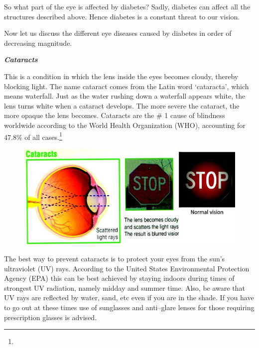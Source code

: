 So what part of the eye is affected by diabetes? Sadly, diabetes can affect all the structures described above. Hence diabetes is a constant threat to our vision.


Now let us discuss the different eye diseases caused by diabetes in order of decreasing magnitude.

\textbf{\textit{Cataracts}}

This is a condition in which the lens inside the eyes becomes cloudy, thereby blocking light. The name cataract comes from the Latin word ‘cataracta’, which means waterfall. Just as the water rushing down a waterfall appears white, the lens turns white when a cataract develops. The more severe the cataract, the more opaque the lens becomes. Cataracts are the \# 1 cause of blindness worldwide according to the World Health Organization (WHO), accounting for 47.8\% of all cases.\footnote{}

\begin{figure}
\includegraphics{images/050.jpg}
\end{figure}


The best way to prevent cataracts is to protect your eyes from the sun’s ultraviolet (UV) rays. According to the United States Environmental Protection Agency (EPA) this can be best achieved by staying indoors during times of strongest UV radiation, namely midday and summer time. Also, be aware that UV rays are reflected by water, sand, etc even if you are in the shade. If you have to go out at these times use of sunglasses and anti–glare lenses for those requiring prescription glasses is advised.

